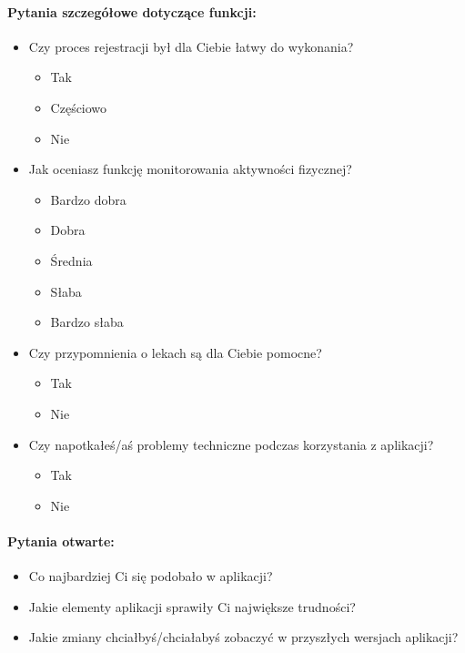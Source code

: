 \paragraph{Pytania szczegółowe dotyczące funkcji:}
\begin{itemize}
  \item Czy proces rejestracji był dla Ciebie łatwy do wykonania?
    \begin{itemize}
      \item Tak
      \item Częściowo
      \item Nie
    \end{itemize}
  \item Jak oceniasz funkcję monitorowania aktywności ﬁzycznej?
    \begin{itemize}
      \item Bardzo dobra
      \item Dobra
      \item Średnia
      \item Słaba
      \item Bardzo słaba
    \end{itemize}
  \item Czy przypomnienia o lekach są dla Ciebie pomocne?
    \begin{itemize}
      \item Tak
      \item Nie
    \end{itemize}
  \item Czy napotkałeś/aś problemy techniczne podczas korzystania z aplikacji?
    \begin{itemize}
      \item Tak
      \item Nie
    \end{itemize}
\end{itemize}

\paragraph{Pytania otwarte:}
\begin{itemize}
  \item Co najbardziej Ci się podobało w aplikacji?
  \item Jakie elementy aplikacji sprawiły Ci największe trudności?
  \item Jakie zmiany chciałbyś/chciałabyś zobaczyć w przyszłych wersjach aplikacji?
\end{itemize}
